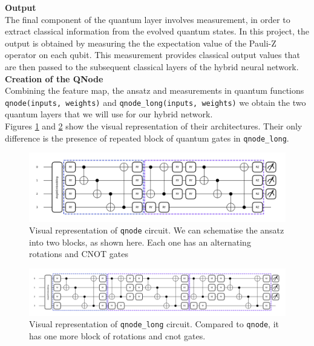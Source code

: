 \documentclass[10pt]{article}
\begin{document}
\noindent \textbf{Output} \\
The final component of the quantum layer involves measurement, in order to extract classical information from the evolved quantum states.
In this project, the output is obtained by measuring the the expectation value of the Pauli-Z operator on each qubit.
This measurement provides classical output values that are then passed to the subsequent classical layers of the hybrid neural network. \\ 

\noindent \textbf{Creation of the QNode} \\
Combining the feature map, the ansatz and measurements in quantum functions \texttt{qnode(inputs, weights)} and \texttt{qnode\_long(inputs, weights)} we obtain the two quantum layers that we will use for our hybrid network. \\
Figures \ref{fig:qnode} and \ref{fig:qnode_long} show the visual representation of their architectures. Their only difference is the presence of repeated block of quantum gates in \texttt{qnode\_long}.

\begin{figure}[H]
    \centering
    \includegraphics[width=\linewidth]{img/qnode_withblock.png}
    \caption{Visual representation of \texttt{qnode} circuit. We can schematise the ansatz into two blocks, as shown here. Each one has an alternating rotations and CNOT gates}
    \label{fig:qnode}
\end{figure}

\begin{figure}[H]
    \centering
    \includegraphics[width=1\linewidth]{img/qnode_long_withblock.png}
    \caption{Visual representation of \texttt{qnode\_long} circuit. Compared to \texttt{qnode}, it has one more block of rotations and cnot gates.}
    \label{fig:qnode_long}
\end{figure}
\end{document}
